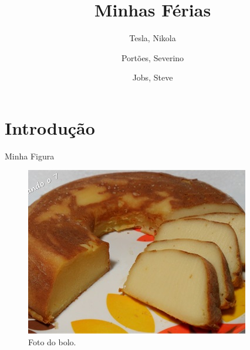 \documentclass[a4paper,11pt,twocolumn]{article}
\title{Minhas Férias}
\author{Tesla, Nikola \and Portões, Severino \and Jobs, Steve}
\begin{document}
  \maketitle
  \tableofcontents

  \section{Introdução}
    Minha Figura

    \begin{figure}[h!]
      \centering
      \includegraphics[width=0.4 \textwidth]{bolo.jpg}
      \caption{Foto do bolo.}
    \end{figure}
\end{document}
